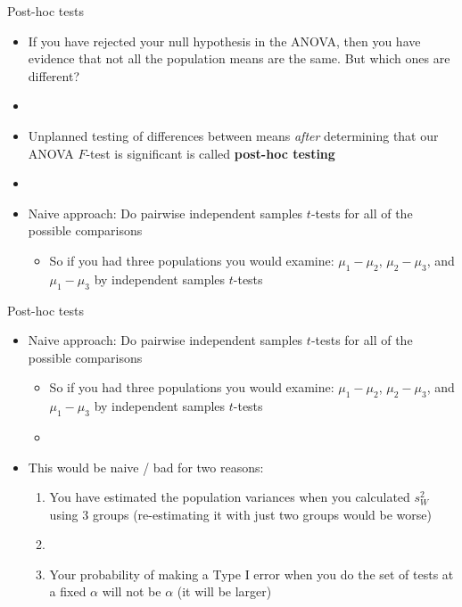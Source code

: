 \documentclass[xcolor=dvipsnames]{beamer}
\begin{document}
\begin{frame}{Post-hoc tests}
	\begin{itemize}
		\item If you have rejected your null hypothesis in the ANOVA, then you have evidence that not all the population means are the same. But which ones are different?
		\item[]
		\item Unplanned testing of differences between means \emph{after} determining that our ANOVA $F$-test is significant is called \textbf{post-hoc testing}
		\item[]
		\item Naive approach: Do pairwise independent samples $t$-tests for all of the possible comparisons
		\begin{itemize}
			\item So if you had three populations you would examine: $\mu_1-\mu_2$, $\mu_2-\mu_3$, and $\mu_1-\mu_3$ by independent samples $t$-tests
		\end{itemize}
	\end{itemize}
\end{frame}

\begin{frame}{Post-hoc tests}
	\begin{itemize}
		\item Naive approach: Do pairwise independent samples $t$-tests for all of the possible comparisons
		\begin{itemize}
			\item So if you had three populations you would examine: $\mu_1-\mu_2$, $\mu_2-\mu_3$, and $\mu_1-\mu_3$ by independent samples $t$-tests
			\item[]
		\end{itemize}
		\item This would be naive / bad for two reasons:
		\begin{enumerate}
			\item You have estimated the population variances when you calculated $s^2_W$ using 3 groups (re-estimating it with just two groups would be worse)
			\item[]
			\item Your probability of making a Type I error when you do the set of tests at a fixed $\alpha$ will not be $\alpha$ (it will be larger)
		\end{enumerate}
	\end{itemize}
\end{frame}
\end{document}
